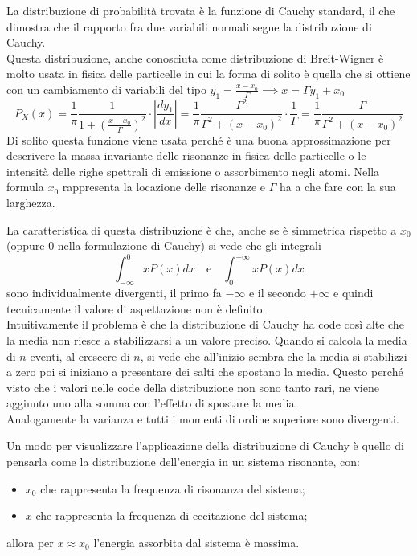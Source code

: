 \documentclass[openany,a4paper,12pt]{book}
\theoremstyle{remark}
\begin{document}
La distribuzione di probabilità trovata è la funzione di Cauchy standard, il che dimostra che il rapporto fra due variabili normali segue la distribuzione di Cauchy. \\
Questa distribuzione, anche conosciuta come distribuzione di Breit-Wigner è molto usata in fisica delle particelle in cui la forma di solito è quella che si ottiene con un cambiamento di variabili del tipo $y_1 = \frac{x - x_0}{\Gamma} \implies x = \Gamma y_1 + x_0$
\[
P_X(x) = \frac{1}{\pi} \frac{1}{1 + \left( \frac{x - x_0}{\Gamma} \right)^2} \cdot \left| \frac{dy_1}{dx} \right| = \frac{1}{\pi} \frac{\Gamma^2}{\Gamma^2 + (x - x_0)^2} \cdot \frac{1}{\Gamma} = \frac{1}{\pi} \frac{\Gamma}{\Gamma^2 + (x - x_0)^2}
\]
Di solito questa funzione viene usata perché è una buona approssimazione per descrivere la massa invariante delle risonanze in fisica delle particelle o le intensità delle righe spettrali di emissione o assorbimento negli atomi. Nella formula $x_0$ rappresenta la locazione delle risonanze e $\Gamma$ ha a che fare con la sua larghezza.

La caratteristica di questa distribuzione è che, anche se è simmetrica rispetto a $x_0$ (oppure 0 nella formulazione di Cauchy) si vede che gli integrali
\[
\int_{-\infty}^{0} x P(x) dx \quad \text{e} \quad \int_{0}^{+\infty} x P(x) dx
\]
sono individualmente divergenti, il primo fa $-\infty$ e il secondo $+\infty$ e quindi tecnicamente il valore di aspettazione non è definito. \\
Intuitivamente il problema è che la distribuzione di Cauchy ha code così alte che la media non riesce a stabilizzarsi a un valore preciso. Quando si calcola la media di $n$ eventi, al crescere di $n$, si vede che all'inizio sembra che la media si stabilizzi a zero poi si iniziano a presentare dei salti che spostano la media. Questo perché visto che i valori nelle code della distribuzione non sono tanto rari, ne viene aggiunto uno alla somma con l'effetto di spostare la media. \\
Analogamente la varianza e tutti i momenti di ordine superiore sono divergenti.

Un modo per visualizzare l'applicazione della distribuzione di Cauchy è quello di pensarla come la distribuzione dell'energia in un sistema risonante, con:
\begin{itemize}
    \item $x_0$ che rappresenta la frequenza di risonanza del sistema;
    \item $x$ che rappresenta la frequenza di eccitazione del sistema;
\end{itemize}
allora per $x \approx x_0$ l'energia assorbita dal sistema è massima.
\end{document}
